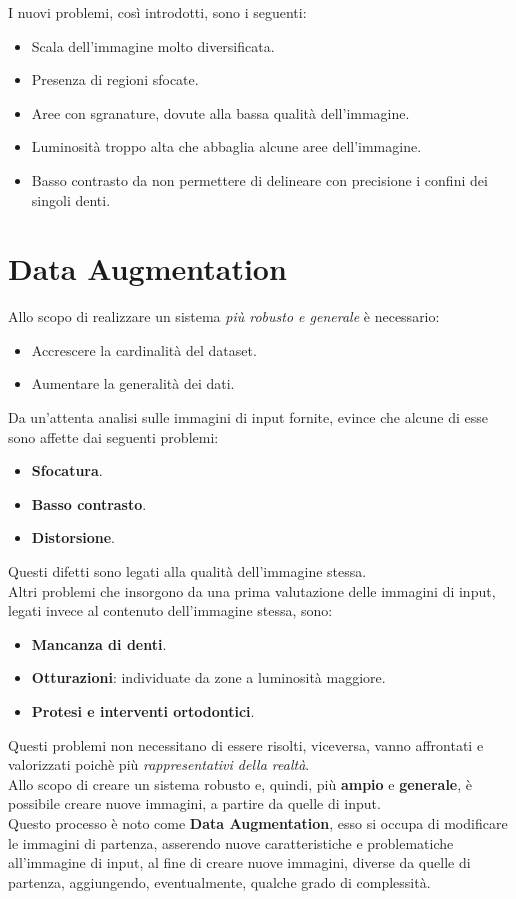 \documentclass[12pt,a4paper,openright,twoside]{book}
\begin{document}
I nuovi problemi, così introdotti, sono i seguenti:
\begin{itemize}
\item Scala dell'immagine molto diversificata.
\item Presenza di regioni sfocate.
\item Aree con sgranature, dovute alla bassa qualità dell'immagine.
\item Luminosità troppo alta che abbaglia alcune aree dell'immagine.
\item Basso contrasto da non permettere di delineare con precisione i confini dei singoli denti.
\end{itemize}

\section{Data Augmentation}
Allo scopo di realizzare un sistema {\itshape più robusto e generale} è necessario:
\begin{itemize}
\item Accrescere la cardinalità del dataset.
\item Aumentare la generalità dei dati.
\end{itemize}
Da un'attenta analisi sulle immagini di input fornite, evince che alcune di esse sono affette dai seguenti problemi:
\begin{itemize}
\item \textbf{Sfocatura}.
\item \textbf{Basso contrasto}.
\item \textbf{Distorsione}.
\end{itemize}
Questi difetti sono legati alla qualità dell'immagine stessa.\\
Altri problemi che insorgono da una prima valutazione delle immagini di input, legati invece al contenuto dell'immagine stessa, sono:
\begin{itemize}
\item \textbf{Mancanza di denti}.
\item \textbf{Otturazioni}: individuate da zone a luminosità maggiore.
\item \textbf{Protesi e interventi ortodontici}.
\end{itemize}
Questi problemi non necessitano di essere risolti, viceversa, vanno affrontati e valorizzati poichè più {\itshape rappresentativi della realtà}.\\

Allo scopo di creare un sistema  robusto e, quindi, più \textbf{ampio} e \textbf{generale}, è possibile creare nuove immagini, a partire da quelle di input.\\
Questo processo è noto come \textbf{Data Augmentation}, esso si occupa di modificare le immagini di partenza, asserendo nuove caratteristiche e problematiche all'immagine di input, al fine di creare nuove immagini, diverse da quelle di partenza, aggiungendo, eventualmente, qualche grado di complessità.\\
\end{document}
